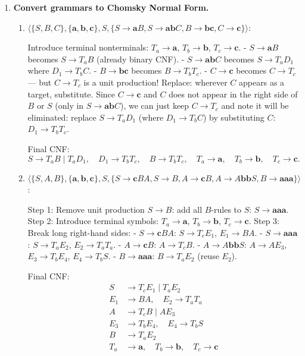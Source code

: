\begin{enumerate}[{9.}1. ]
\begin{enumerate}
\textbf{Summary}: With the full CNF tree rooted at $Z$,
\[
\lceil \log_2 |x| \rceil + 1 \leq \text{depth} \leq |x|.
\]
If the initial $Z\to S$ edge is ignored, the bounds become
$\lceil \log_2 |x| \rceil \leq \text{depth} \leq |x|-1$.
\end{enumerate}

\item \textbf{Convert grammars to Chomsky Normal Form.}

\begin{enumerate}
\item $\langle\{S,B,C\},\{\pmb{a},\pmb{b},\pmb{c}\},S,\{S\to\pmb{a}B,S\to\pmb{ab}C,B\to\pmb{bc},C\to\pmb{c}\}\rangle$:

Introduce terminal nonterminals: $T_a \to \pmb{a}$, $T_b \to \pmb{b}$, $T_c \to \pmb{c}$.
- $S \to \pmb{a}B$ becomes $S \to T_a B$ (already binary CNF).
- $S \to \pmb{ab}C$ becomes $S \to T_a D_1$ where $D_1 \to T_b C$.
- $B \to \pmb{bc}$ becomes $B \to T_b T_c$.
- $C \to \pmb{c}$ becomes $C \to T_c$ --- but $C \to T_c$ is a unit production! Replace: wherever $C$ appears as a target, substitute. Since $C \to \pmb{c}$ and $C$ does not appear in the right side of $B$ or $S$ (only in $S \to \pmb{ab}C$), we can just keep $C \to T_c$ and note it will be eliminated: replace $S \to T_a D_1$ (where $D_1 \to T_b C$) by substituting $C$: $D_1 \to T_b T_c$.

Final CNF:
\[
S \to T_a B \mid T_a D_1, \quad D_1 \to T_b T_c, \quad B \to T_b T_c, \quad T_a \to \pmb{a}, \quad T_b \to \pmb{b}, \quad T_c \to \pmb{c}.
\]

\item $\langle\{S,A,B\},\{\pmb{a},\pmb{b},\pmb{c}\},S,\{S\to\pmb{c}BA,S\to B,A\to\pmb{c}B,A\to A\pmb{bb}S,B\to\pmb{aaa}\}\rangle$:

Step 1: Remove unit production $S \to B$: add all $B$-rules to $S$: $S \to \pmb{aaa}$.
Step 2: Introduce terminal symbols: $T_a \to \pmb{a}$, $T_b \to \pmb{b}$, $T_c \to \pmb{c}$.
Step 3: Break long right-hand sides:
- $S \to \pmb{c}BA$: $S \to T_c E_1$, $E_1 \to BA$.
- $S \to \pmb{aaa}$: $S \to T_a E_2$, $E_2 \to T_a T_a$.
- $A \to \pmb{c}B$: $A \to T_c B$.
- $A \to A\pmb{bb}S$: $A \to A E_3$, $E_3 \to T_b E_4$, $E_4 \to T_b S$.
- $B \to \pmb{aaa}$: $B \to T_a E_2$ (reuse $E_2$).

Final CNF:
\begin{align*}
S &\to T_c E_1 \mid T_a E_2 \\
E_1 &\to BA,\quad E_2 \to T_a T_a \\
A &\to T_c B \mid A E_3 \\
E_3 &\to T_b E_4,\quad E_4 \to T_b S \\
B &\to T_a E_2 \\
T_a &\to \pmb{a},\quad T_b \to \pmb{b},\quad T_c \to \pmb{c}
\end{align*}


\end{enumerate}
\end{enumerate}
